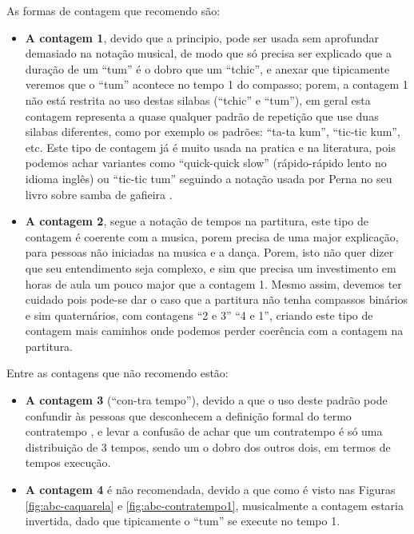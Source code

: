 As formas de contagem que recomendo são:
\begin{itemize}
\item \textbf{A contagem 1}, 
devido que a principio, pode ser usada sem aprofundar demasiado 
na notação musical, de modo que só precisa ser explicado que a duração de um 
``tum'' é o dobro que um ``tchic'', e anexar que tipicamente veremos que o ``tum''
acontece no tempo 1 do compasso; 
porem, a contagem 1 não está restrita ao uso destas silabas (``tchic'' e ``tum''), 
em geral esta contagem representa a quase qualquer padrão de repetição
que use duas silabas diferentes, como por exemplo os padrões: ``ta-ta kum'', ``tic-tic kum'', etc. 
Este tipo de contagem já é muito usada na pratica e na literatura, pois 
podemos achar variantes como ``quick-quick slow'' (rápido-rápido lento no idioma inglês)
ou ``tic-tic tum'' seguindo a notação usada por Perna no seu livro sobre samba de gafieira \cite[pp. 146]{perna2002samba}.
\item \textbf{A contagem 2}, segue a notação de tempos na partitura, este tipo de
contagem é coerente com a musica, porem precisa de uma major explicação, 
para pessoas não iniciadas na musica e a dança. Porem, isto não quer dizer que seu
entendimento seja complexo, e sim que precisa um investimento em horas de aula
um pouco major que a contagem 1.
Mesmo assim, devemos ter cuidado pois pode-se dar o caso que a partitura não tenha compassos binários 
e sim quaternários, com contagens ``2 e 3'' ``4 e 1'', 
criando este tipo de contagem mais caminhos onde podemos perder coerência com a contagem na partitura.\\
\end{itemize}


Entre as contagens que não recomendo estão:
\begin{itemize}
\item \textbf{A contagem 3} (``con-tra tempo''), 
devido a que o uso deste padrão pode confundir às pessoas que desconhecem 
a definição formal do termo contratempo \cite[pp. 16]{mascarenhascurso} \cite[pp. 36]{azevedocompor}, 
e levar a confusão de achar que um contratempo é só uma distribuição de 3 tempos, 
sendo um o dobro dos outros dois, em termos de tempos execução.
\item \textbf{A contagem 4} é não recomendada, devido a que como é visto nas Figuras 
\ref{fig:abc-caquarela} e \ref{fig:abc-contratempo1}, musicalmente a contagem estaria invertida,
dado que tipicamente o ``tum'' se execute no tempo 1.\\
\end{itemize}


